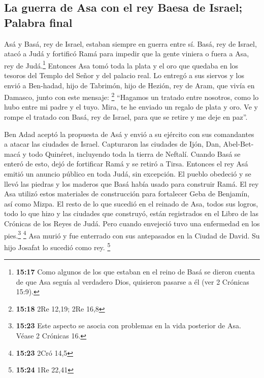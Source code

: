 \hypertarget{la-guerra-de-asa-con-el-rey-baesa-de-israel-palabra-final}{%
\subsection{La guerra de Asa con el rey Baesa de Israel; Palabra
final}\label{la-guerra-de-asa-con-el-rey-baesa-de-israel-palabra-final}}

 Asá y Basá, rey de Israel, estaban siempre en guerra
entre sí.  Basá, rey de Israel, atacó a Judá y fortificó
Ramá para impedir que la gente viniera o fuera a Asa, rey de
Judá.\footnote{\textbf{15:17} Como algunos de los que estaban en el
  reino de Basá se dieron cuenta de que Asa seguía al verdadero Dios,
  quisieron pasarse a él (ver 2 Crónicas 15:9).} 
Entonces Asa tomó toda la plata y el oro que quedaba en los tesoros del
Templo del Señor y del palacio real. Lo entregó a sus siervos y los
envió a Ben-hadad, hijo de Tabrimón, hijo de Hezión, rey de Aram, que
vivía en Damasco, junto con este mensaje: \footnote{\textbf{15:18} 2Re
  12,19; 2Re 16,8}  ``Hagamos un tratado entre nosotros,
como lo hubo entre mi padre y el tuyo. Mira, te he enviado un regalo de
plata y oro. Ve y rompe el tratado con Basá, rey de Israel, para que se
retire y me deje en paz''.

 Ben Adad aceptó la propuesta de Asá y envió a su
ejército con sus comandantes a atacar las ciudades de Israel. Capturaron
las ciudades de Ijón, Dan, Abel-Bet-macá y todo Quinéret, incluyendo
toda la tierra de Neftalí.  Cuando Basá se enteró de
esto, dejó de fortificar Ramá y se retiró a Tirsa. 
Entonces el rey Asá emitió un anuncio público en toda Judá, sin
excepción. El pueblo obedeció y se llevó las piedras y los maderos que
Basá había usado para construir Ramá. El rey Asa utilizó estos
materiales de construcción para fortalecer Geba de Benjamín, así como
Mizpa.  El resto de lo que sucedió en el reinado de Asa,
todos sus logros, todo lo que hizo y las ciudades que construyó, están
registrados en el Libro de las Crónicas de los Reyes de Judá. Pero
cuando envejeció tuvo una enfermedad en los pies.\footnote{\textbf{15:23}
  Este aspecto se asocia con problemas en la vida posterior de Asa.
  Véase 2 Crónicas 16.} \footnote{\textbf{15:23} 2Cró 14,5}
 Asa murió y fue enterrado con sus antepasados en la
Ciudad de David. Su hijo Josafat lo sucedió como rey. \footnote{\textbf{15:24}
  1Re 22,41}

